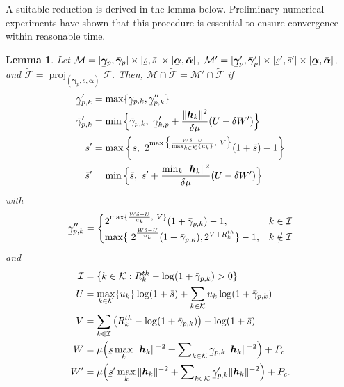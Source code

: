 \documentclass[a4paper,10pt,journal]{IEEEtran}
\DeclareMathOperator\proj{proj}
\let\vec\bm
\newcommand{\ubar}[1]{\underaccent{\bar}{#1}}
\newtheorem{lemma}{Lemma}
\begin{document}
A suitable reduction is derived in the lemma below. Preliminary numerical experiments have shown that this procedure is essential to ensure convergence within reasonable time.

\begin{lemma} \label{lem:reduction}
	Let $\mathcal M = [\ubar{\vec\gamma}_p, \bar{\vec\gamma}_p]\times[\ubar s, \bar s]\times[\ubar{\vec\alpha}, \bar{\vec\alpha}]$, $\mathcal M' =  [\ubar{\vec\gamma}_p', \bar{\vec\gamma}_p']\times[\ubar s', \bar s']\times[\ubar{\vec\alpha}, \bar{\vec\alpha}]$, and $\tilde{\mathcal F} = \proj_{(\vec\gamma_p, s, \vec\alpha)} \mathcal F$. Then, $\mathcal M \cap \tilde{\mathcal F} = \mathcal M' \cap \tilde{\mathcal F}$ if
	\begin{align*}
		\ubar{\gamma}_{p,k}' &= \max\{ \ubar{\gamma}_{p,k}, \ubar{\gamma}_{p,k}'' \} \\
		\bar{\gamma}_{p,k}' &= \min\Big\{ \bar{\gamma}_{p,k},\ \ubar{\gamma}_{k,p}' + \frac{\Vert \vec h_k\Vert^2}{\delta\mu} ( U - \delta W') \Big\} \\
		\ubar s' &= \max\left\{ \ubar s,\ 2^{\max\big\{\frac{W \delta - U}{\max_{k\in\mathcal K} \{u_k\}},\ V\big\}} (1+ \bar s) - 1 \right\} \\
		\bar{s}' &= \min\Big\{ \bar s,\ \ubar{s}' + \frac{\min_k \Vert \vec h_k\Vert^2}{\delta\mu} ( U - \delta W') \Big\}
	\end{align*}
	with
	\begin{equation*}
		\ubar{\gamma}_{p,k}'' = 
		\begin{cases}
			2^{\max\{ \frac{W \delta - U}{u_k},\ V\}} (1+ \bar\gamma_{p,k}) - 1, & k\in\mathcal I \\
			\max\{ \ 2^{\frac{W \delta - U}{u_k}} (1+ \bar\gamma_{p,\kappa}), 2^{V+R_k^{th}}  \} - 1, & k\notin\mathcal I
		\end{cases}
	\end{equation*}
	and
	\begin{align*}
		\mathcal I &= \{ k \in\mathcal K : R_k^{th} - \log(1+ \bar\gamma_{p,k}) > 0 \} \\
		U &= \max_{k\in\mathcal K} \{ u_k \} \log(1+ \bar s) + \sum_{k\in\mathcal{K}} u_k \log(1+ \bar\gamma_{p,k}) \\
		V &= \sum_{k\in \mathcal{I}} \left( R_k^{th} - \log(1+ \bar\gamma_{p,k}) \right) -  \log(1+ \bar s) \\
		W &= \mu \Big( \ubar s \max_k \Vert \vec h_k \Vert^{-2} + \sum\nolimits_{k\in\mathcal K} \ubar{\gamma}_{p,k}\Vert \vec h_{k} \Vert^{-2} \Big) + P_c \\
		W' &= \mu \Big( \ubar s' \max_k \Vert \vec h_k \Vert^{-2} + \sum\nolimits_{k\in\mathcal K} \ubar{\gamma}_{p,k}'\Vert \vec h_{k} \Vert^{-2} \Big) + P_c.
	\end{align*}
\end{lemma}
\end{document}
